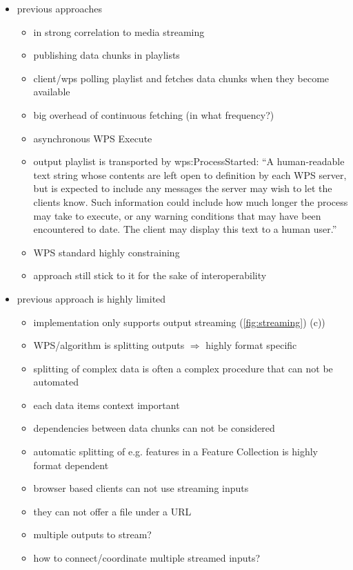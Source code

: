 \begin{itemize}
		\item previous approaches \citep{foerster2012live}
		\begin{itemize}
			\item in strong correlation to media streaming \citep{ietf:draft-pantos-http-live-streaming-12}
			\item publishing data chunks in playlists
			\item client/wps polling playlist and fetches data chunks when they become available
			\item big overhead of continuous fetching (in what frequency?)
			\item asynchronous WPS Execute
			\item output playlist is transported by wps:ProcessStarted: ``A human-readable text string whose contents are left open to definition by each WPS server, but is expected to include any messages the server may wish to let the clients know. Such information could include how much longer the process may take to execute, or any warning conditions that may have been encountered to date. The client may display this text to a human user.''
			\item WPS standard highly constraining
			\item approach still stick to it for the sake of interoperability
		\end{itemize}
		\item previous approach is highly limited
		\begin{itemize}
			\item implementation only supports output streaming (\ref{fig:streaming}) (c))
			\item WPS/algorithm is splitting outputs $\Rightarrow$ highly format specific
			\item splitting of complex data is often a complex procedure that can not be automated
			\item each data items context important
			\item dependencies between data chunks can not be considered
			\item automatic splitting of e.g. features in a Feature Collection is highly format dependent
			\item browser based clients can not use streaming inputs
			\item they can not offer a file under a URL
			\item multiple outputs to stream?
			\item how to connect/coordinate multiple streamed inputs?

\end{itemize}
\end{itemize}

